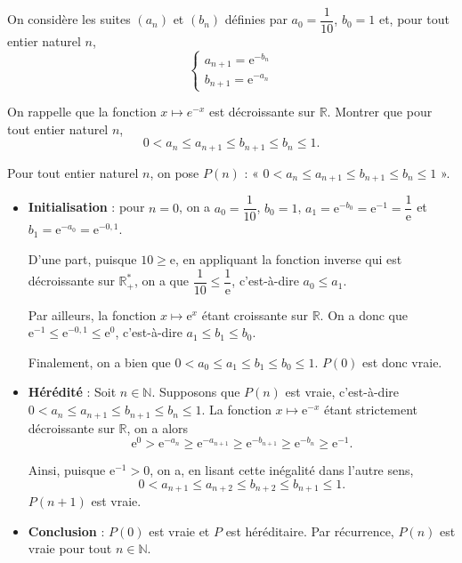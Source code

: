 \documentclass[11pt,fleqn]{book} %
\begin{document}
\begin{exercise}[topic=rec03,subtitle= {(Centres étrangers 2022)}]On considère les suites \((a_n)\) et \((b_n)\) définies par \(a_0= \dfrac{1}{10}\), \(b_0=1\) et, pour tout entier naturel \(n\), \[\left\{\begin{array}{l}a_{n+1}=\mathrm{e}^{-b_n}\\b_{n+1}=\mathrm{e}^{-a_n}\end{array}\right.\]

On rappelle que la fonction \(x\mapsto e^{-x}\) est décroissante sur \(\mathbb{R}\). Montrer que pour tout entier naturel \(n\), 
\[ 0 < a_n \leqslant a_{n+1} \leqslant b_{n+1} \leqslant b_n \leqslant 1 .\]\end{exercise}

\begin{solution}Pour tout entier naturel \(n\), on pose \(P(n)\) : « \(0 < a_n \leqslant a_{n+1} \leqslant b_{n+1} \leqslant b_n \leqslant 1\) ».

\begin{itemize} \item \textbf{Initialisation} : pour \(n=0\), on a \(a_0=\dfrac{1}{10}\), \(b_0=1\), \(a_1 =\mathrm{e}^{-b_0}=\mathrm{e}^{-1}=\dfrac{1}{\mathrm{e}}\) et \(b_1=\mathrm{e}^{-a_0}=\mathrm{e}^{-0,1}\).

D'une part, puisque \( 10 \geqslant \mathrm{e}\), en appliquant la fonction inverse qui est décroissante sur \(\mathbb{R}^*_+\), on a que \(\dfrac{1}{10} \leqslant \dfrac{1}{\mathrm{e}}\), c'est-à-dire \(a_0 \leqslant a_1\). 

Par ailleurs, la fonction \(x \mapsto \mathrm{e}^{x}\) étant croissante sur \(\mathbb{R}\). On a donc que \(\mathrm{e}^{-1} \leqslant \mathrm{e}^{-0,1} \leqslant \mathrm{e}^0\), c'est-à-dire \(a_1 \leqslant b_1 \leqslant b_0\). 

Finalement, on a bien que \( 0< a_0 \leqslant a_1 \leqslant b_1 \leqslant b_0 \leqslant 1\). \(P(0)\) est donc vraie.

\item \textbf{Hérédité} : Soit \(n\in\mathbb{N}\). Supposons que \(P(n)\) est vraie, c'est-à-dire \(0 < a_n \leqslant a_{n+1} \leqslant b_{n+1} \leqslant b_n \leqslant 1\). La fonction \( x \mapsto \mathrm{e}^{-x}\) étant strictement décroissante sur \(\mathbb{R}\), on a alors 
\[\mathrm{e}^0 > \mathrm{e}^{-a_n} \geqslant \mathrm{e}^{-a_{n+1}} \geqslant \mathrm{e}^{-b_{n+1}} \geqslant \mathrm{e}^{-b_n} \geqslant \mathrm{e}^{-1}.\]

Ainsi, puisque \(\mathrm{e}^{-1} > 0\), on a, en lisant cette inégalité dans l'autre sens,
\[0 < a_{n+1} \leqslant a_{n+2} \leqslant b_{n+2} \leqslant b_{n+1} \leqslant 1.\]
\(P(n+1)\) est vraie.
\item \textbf{Conclusion} : \(P(0)\) est vraie et \(P\) est héréditaire. Par récurrence, \(P(n)\) est vraie pour tout \(n\in\mathbb{N}\).
\end{itemize}\end{solution}
\end{document}
